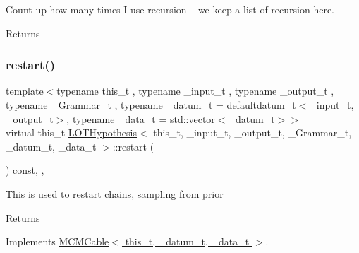 Count up how many times I use recursion -- we keep a list of recursion here. 

\begin{DoxyReturn}{Returns}

\end{DoxyReturn}
\mbox{\label{class_l_o_t_hypothesis_ab058030e50b719fdbc84544aad712eed}} 
\subsubsection{\texorpdfstring{restart()}{restart()}}
{\footnotesize\ttfamily template$<$typename this\+\_\+t , typename \+\_\+input\+\_\+t , typename \+\_\+output\+\_\+t , typename \+\_\+\+Grammar\+\_\+t , typename \+\_\+datum\+\_\+t  = defaultdatum\+\_\+t$<$\+\_\+input\+\_\+t, \+\_\+output\+\_\+t$>$, typename \+\_\+data\+\_\+t  = std\+::vector$<$\+\_\+datum\+\_\+t$>$$>$ \\
virtual this\+\_\+t \hyperlink{class_l_o_t_hypothesis}{L\+O\+T\+Hypothesis}$<$ this\+\_\+t, \+\_\+input\+\_\+t, \+\_\+output\+\_\+t, \+\_\+\+Grammar\+\_\+t, \+\_\+datum\+\_\+t, \+\_\+data\+\_\+t $>$\+::restart (\begin{DoxyParamCaption}{ }\end{DoxyParamCaption}) const\hspace{0.3cm}{\ttfamily [inline]}, {\ttfamily [override]}, {\ttfamily [virtual]}}

This is used to restart chains, sampling from prior \begin{DoxyReturn}{Returns}

\end{DoxyReturn}


Implements \hyperlink{class_m_c_m_cable_aa7017e18b4a1508bc4cff90fb82a8ec1}{M\+C\+M\+Cable$<$ this\+\_\+t, \+\_\+datum\+\_\+t, \+\_\+data\+\_\+t $>$}.

\mbox{\label{class_l_o_t_hypothesis_a8726ec9e602392436d2e9f33fb3dcfd6}} 

